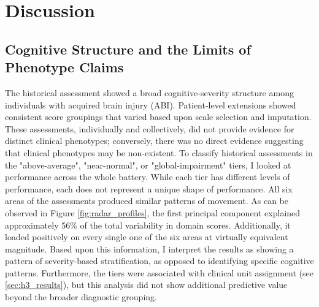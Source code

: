 
\chapter{Discussion}\label{Chapter5}
\vspace*{1.5\baselineskip}


\section{Cognitive Structure and the Limits of Phenotype Claims}
The historical assessment showed a broad cognitive-severity structure among individuals with acquired brain injury (ABI). Patient-level extensions showed consistent score groupings that varied based upon scale selection and imputation. These assessments, individually and collectively, did not provide evidence for distinct clinical phenotypes; conversely, there was no direct evidence suggesting that clinical phenotypes may be non-existent. To classify historical assessments in the "above-average", "near-normal", or "global-impairment" tiers, I looked at performance across the whole battery. While each tier has different levels of performance, each does not represent a unique shape of performance. All six areas of the assessments produced similar patterns of movement. As can be observed in Figure \ref{fig:radar_profiles}, the first principal component explained approximately 56\% of the total variability in domain scores. Additionally, it loaded positively on every single one of the six areas at virtually equivalent magnitude. Based upon this information, I interpret the results as showing a pattern of severity-based stratification, as opposed to identifying specific cognitive patterns. Furthermore, the tiers were associated with clinical unit assignment (see \textsection{}\ref{sec:h3_results}), but this analysis did not show additional predictive value beyond the broader diagnostic grouping.

